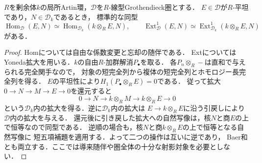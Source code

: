\begin{lemma}[平坦対象を左変数とする一次拡大の還元]
\label{lem:abel-flat-object-ext-one}
$R$を剰余体$k$の局所Artin環，$\mathcal D$を$R$-線型Grothendieck圏とする．
$E\in\mathcal D$が$R$-平坦であり，$N\in\mathcal D_k$であるとき，
標準的な同型
\[
 \operatorname{Hom}_{\mathcal D}(E,N)
 \simeq\operatorname{Hom}_{\mathcal D_k}(k\otimes_R E,N),
 \qquad
 \operatorname{Ext}^1_{\mathcal D}(E,N)
 \simeq\operatorname{Ext}^1_{\mathcal D_k}(k\otimes_R E,N)
\]
がある．
\end{lemma}
\begin{proof}
Homについては自由な係数変更と忘却の随伴である．
ExtについてはYoneda拡大を用いる．$k$の自由$R$-加群解消$P_\bullet$を取る．
各$P_n\otimes_R-$は直和で与えられる完全関手なので，
対象の短完全列から複体の短完全列とホモロジー長完全列を得る．
$E$の平坦性により$H_1(P_\bullet\otimes_R E)=0$である．
従って拡大$0\to N\to M\to E\to0$を還元すると
\[
 0\longrightarrow N\longrightarrow k\otimes_R M
 \longrightarrow k\otimes_R E\longrightarrow0
\]
という$\mathcal D_k$内の拡大を得る．逆に$\mathcal D_k$内の拡大は
$E\to k\otimes_R E$に沿う引戻しにより$\mathcal D$内の拡大を与える．
還元後に引き戻した拡大への自然写像は，核$N$と商$E$の上で恒等なので同型である．
逆順の場合も，核$N$と商$k\otimes_R E$の上で恒等となる自然写像に
短五項補題を適用する．よって二つの操作は互いに逆であり，
Baer和とも両立する．ここでは導来随伴や圏全体の十分な射影対象を必要としない．
\end{proof}

